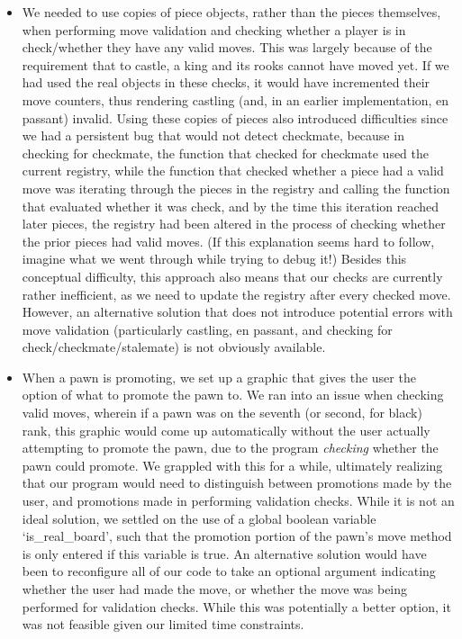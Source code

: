 \documentclass{article}
\begin{document}
\begin{itemize}
    \item We needed to use copies of piece objects, rather than the pieces themselves, when performing move validation and checking whether a player is in check/whether they have any valid moves. This was largely because of the requirement that to castle, a king and its rooks cannot have moved yet. If we had used the real objects in these checks, it would have incremented their move counters, thus rendering castling (and, in an earlier implementation, en passant) invalid. Using these copies of pieces also introduced difficulties since we had a persistent bug that would not detect checkmate, because in checking for checkmate, the function that checked for checkmate used the current registry, while the function that checked whether a piece had a valid move was iterating through the pieces in the registry and calling the function that evaluated whether it was check, and by the time this iteration reached later pieces, the registry had been altered in the process of checking whether the prior pieces had valid moves. (If this explanation seems hard to follow, imagine what we went through while trying to debug it!) Besides this conceptual difficulty, this approach also means that our checks are currently rather inefficient, as we need to update the registry after every checked move. However, an alternative solution that does not introduce potential errors with move validation (particularly castling, en passant, and checking for check/checkmate/stalemate) is not obviously available.
    
    \item When a pawn is promoting, we set up a graphic that gives the user the option of what to promote the pawn to. We ran into an issue when checking valid moves, wherein if a pawn was on the seventh (or second, for black) rank, this graphic would come up automatically without the user actually attempting to promote the pawn, due to the program \textit{checking} whether the pawn could promote. We grappled with this for a while, ultimately realizing that our program would need to distinguish between promotions made by the user, and promotions made in performing validation checks. While it is not an ideal solution, we settled on the use of a global boolean variable `is\_real\_board', such that the promotion portion of the pawn's move method is only entered if this variable is true. An alternative solution would have been to reconfigure all of our code to take an optional argument indicating whether the user had made the move, or whether the move was being performed for validation checks. While this was potentially a better option, it was not feasible given our limited time constraints.
\end{itemize}
\end{document}
